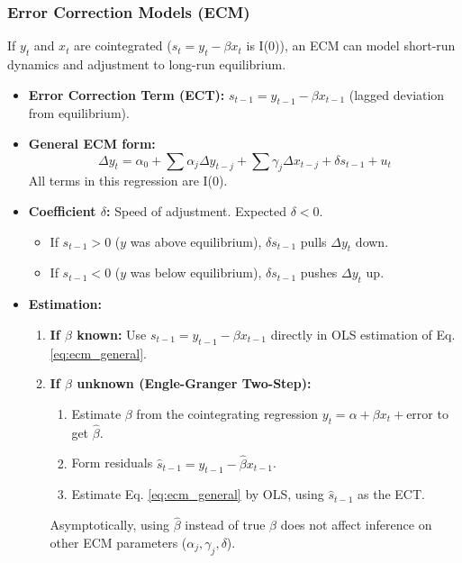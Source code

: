 \documentclass[a4paper, 10pt]{article}
\theoremstyle{definition}	%
\begin{document}
\subsubsection{Error Correction Models (ECM)}
If \(y_t\) and \(x_t\) are cointegrated (\(s_t = y_t - \beta x_t\) is I(0)), an ECM can model short-run dynamics and adjustment to long-run equilibrium.
\begin{itemize}
    \item \textbf{Error Correction Term (ECT):} \(s_{t-1} = y_{t-1} - \beta x_{t-1}\) (lagged deviation from equilibrium).
    \item \textbf{General ECM form:}
    \begin{equation} \label{eq:ecm_general}
    \Delta y_t = \alpha_0 + \sum \alpha_j \Delta y_{t-j} + \sum \gamma_j \Delta x_{t-j} + \delta s_{t-1} + u_t
    \end{equation}
    All terms in this regression are I(0).
    \item \textbf{Coefficient \(\delta\):} Speed of adjustment. Expected \(\delta < 0\).
    \begin{itemize}
        \item If \(s_{t-1} > 0\) (\(y\) was above equilibrium), \(\delta s_{t-1}\) pulls \(\Delta y_t\) down.
        \item If \(s_{t-1} < 0\) (\(y\) was below equilibrium), \(\delta s_{t-1}\) pushes \(\Delta y_t\) up.
    \end{itemize}
    \item \textbf{Estimation:}
    \begin{enumerate}
        \item \textbf{If \(\beta\) known:} Use \(s_{t-1} = y_{t-1} - \beta x_{t-1}\) directly in OLS estimation of Eq. \eqref{eq:ecm_general}.
        \item \textbf{If \(\beta\) unknown (Engle-Granger Two-Step):}
        \begin{enumerate}
            \item Estimate \(\beta\) from the cointegrating regression \(y_t = \alpha + \beta x_t + \text{error}\) to get \(\hat{\beta}\).
            \item Form residuals \(\hat{s}_{t-1} = y_{t-1} - \hat{\beta} x_{t-1}\).
            \item Estimate Eq. \eqref{eq:ecm_general} by OLS, using \(\hat{s}_{t-1}\) as the ECT.
    \end{enumerate}
        Asymptotically, using \(\hat{\beta}\) instead of true \(\beta\) does not affect inference on other ECM parameters (\(\alpha_j, \gamma_j, \delta\)).
    \end{enumerate}
\end{itemize}
\end{document}
